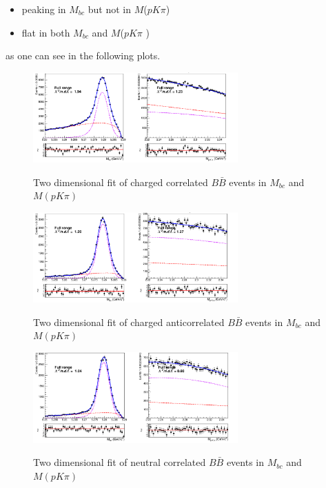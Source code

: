 \begin{itemize}
    \item peaking in $M_{bc}$ but not in $M$($p K \pi$)
    \item flat in both $M_{bc}$ and $M$($p K \pi$ )
\end{itemize}

as one can see in the following plots.

\begin{figure}
\centering
{\includegraphics[width=0.7\textwidth]{04-SimultaneousFit/figs/stream01234_charged_corrLambdaC_TotalGeneric_2DFit_onlyArgus.png}}
\caption{Two dimensional fit of charged correlated $B\bar{B}$  events in $M_{bc}$  and $M(p K \pi)$ }
\label{fig:stream01234_charged_corrLambdaC_TotalGeneric_2DFit}
\end{figure}


\begin{figure}
\centering
{\includegraphics[width=0.7\textwidth]{04-SimultaneousFit/figs/stream12345_charged_anticorrLambdaC_TotalGeneric_2DFit_only_argus.png}}
\caption{Two dimensional fit of charged anticorrelated $B\bar{B}$  events in $M_{bc}$  and $M(p K \pi)$ }
\label{fig:stream12345_charged_anticorrLambdaC_TotalGeneric_2DFit}
\end{figure}

\begin{figure}
\centering
{\includegraphics[width=0.7\textwidth]{04-SimultaneousFit/figs/stream01245_neutral_corrLambdaC_TotalGeneric_2DFit.png}}
\caption{Two dimensional fit of neutral correlated $B\bar{B}$  events in $M_{bc}$  and $M(p K \pi)$ }
\label{fig:stream01245_neutral_corrLambdaC_TotalGeneric_2DFit}
\end{figure}

